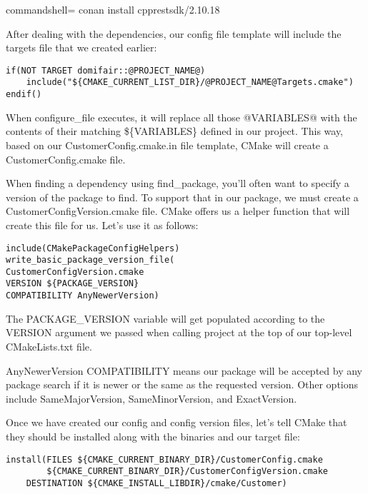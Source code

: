 \begin{tcblisting}{commandshell={}}
conan install cpprestsdk/2.10.18
\end{tcblisting}

After dealing with the dependencies, our config file template will include the targets file that we created earlier:

\begin{lstlisting}[style=styleCMake]
if(NOT TARGET domifair::@PROJECT_NAME@)
	include("${CMAKE_CURRENT_LIST_DIR}/@PROJECT_NAME@Targets.cmake")
endif()
\end{lstlisting}

When configure\_file executes, it will replace all those @VARIABLES@ with the contents of their matching \$\{VARIABLES\} defined in our project. This way, based on our CustomerConfig.cmake.in file template, CMake will create a CustomerConfig.cmake file.

When finding a dependency using find\_package, you'll often want to specify a version of the package to find. To support that in our package, we must create a CustomerConfigVersion.cmake file. CMake offers us a helper function that will create this file for us. Let's use it as follows:

\begin{lstlisting}[style=styleCMake]
include(CMakePackageConfigHelpers)
write_basic_package_version_file(
CustomerConfigVersion.cmake
VERSION ${PACKAGE_VERSION}
COMPATIBILITY AnyNewerVersion)
\end{lstlisting}

The PACKAGE\_VERSION variable will get populated according to the VERSION argument we passed when calling project at the top of our top-level CMakeLists.txt file.

AnyNewerVersion COMPATIBILITY means our package will be accepted by any package search if it is newer or the same as the requested version. Other options include SameMajorVersion, SameMinorVersion, and ExactVersion.

Once we have created our config and config version files, let's tell CMake that they should be installed along with the binaries and our target file:

\begin{lstlisting}[style=styleCMake]
install(FILES ${CMAKE_CURRENT_BINARY_DIR}/CustomerConfig.cmake
		${CMAKE_CURRENT_BINARY_DIR}/CustomerConfigVersion.cmake
	DESTINATION ${CMAKE_INSTALL_LIBDIR}/cmake/Customer)
\end{lstlisting}

